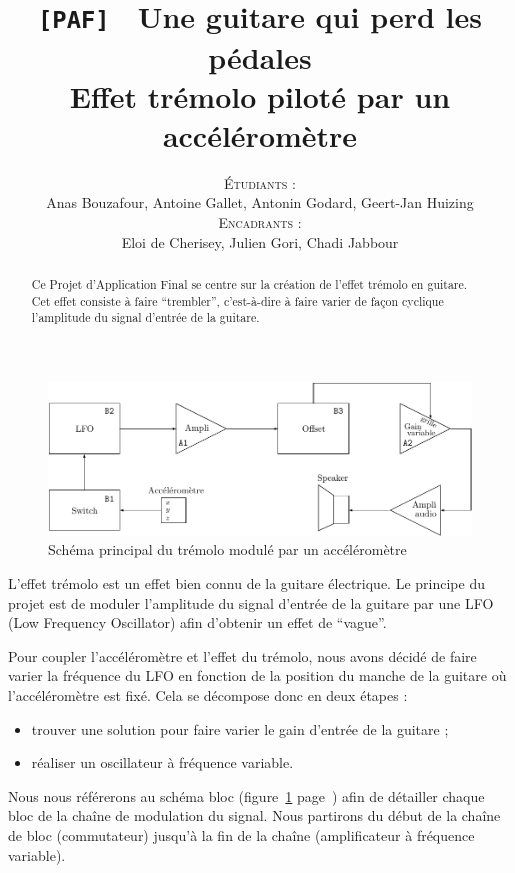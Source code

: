\documentclass[a4paper, 11pt, twocolumn]{article}
\author{\textsc{Étudiants :}\\
Anas Bouzafour, Antoine Gallet, Antonin Godard, Geert-Jan Huizing\\
\textsc{Encadrants :}\\
Eloi de Cherisey, Julien Gori, Chadi Jabbour\\}
\title{\textbf{\texttt{[PAF]}$\quad$Une guitare qui perd les pédales \\ Effet trémolo piloté par un accéléromètre}}
\begin{document}
\maketitle

\begin{abstract}
    Ce Projet d'Application Final se centre sur la création de l'effet trémolo en guitare. Cet effet consiste à faire \enquote{trembler}, c'est-à-dire à faire varier de façon cyclique l'amplitude du signal d'entrée de la guitare. 
\end{abstract}

\begin{figure}[p]
    \centering
    \includegraphics[width=\textwidth]{schema_bloc.pdf}
    \caption{Schéma principal du trémolo modulé par un accéléromètre}
    \label{fig:schemaBloc}
\end{figure}

L'effet trémolo est un effet bien connu de la guitare électrique. Le principe du projet est de moduler l'amplitude du signal d'entrée de la guitare par une LFO (Low Frequency Oscillator) afin d'obtenir un effet de \enquote{vague}.

Pour coupler l'accéléromètre et l'effet du trémolo, nous avons décidé de faire varier la fréquence du LFO en fonction de la position du manche de la guitare où l'accéléromètre est fixé. Cela se décompose donc en deux étapes :
\begin{itemize}
    \item trouver une solution pour faire varier le gain d'entrée de la guitare ;
    \item réaliser un oscillateur à fréquence variable.
\end{itemize}

Nous nous référerons au schéma bloc (figure~\ref{fig:schemaBloc} page~\pageref{fig:schemaBloc}) afin de détailler chaque bloc de la chaîne de modulation du signal. Nous partirons du début de la chaîne de bloc (commutateur) jusqu'à la fin de la chaîne (amplificateur à fréquence variable).
\end{document}
